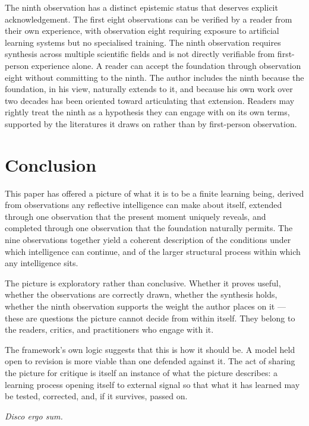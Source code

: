 \documentclass[11pt]{article}
\begin{document}
The ninth observation has a distinct epistemic status that deserves 
explicit acknowledgement. The first eight observations can be 
verified by a reader from their own experience, with observation 
eight requiring exposure to artificial learning systems but no 
specialised training. The ninth observation requires synthesis across 
multiple scientific fields and is not directly verifiable from 
first-person experience alone. A reader can accept the foundation 
through observation eight without committing to the ninth. The author 
includes the ninth because the foundation, in his view, naturally 
extends to it, and because his own work over two decades has been 
oriented toward articulating that extension. Readers may rightly 
treat the ninth as a hypothesis they can engage with on its own 
terms, supported by the literatures it draws on rather than by 
first-person observation.

\section{Conclusion}

This paper has offered a picture of what it is to be a finite learning 
being, derived from observations any reflective intelligence can make 
about itself, extended through one observation that the present moment 
uniquely reveals, and completed through one observation that the 
foundation naturally permits. The nine observations together yield a 
coherent description of the conditions under which intelligence can 
continue, and of the larger structural process within which any 
intelligence sits.

The picture is exploratory rather than conclusive. Whether it proves 
useful, whether the observations are correctly drawn, whether the 
synthesis holds, whether the ninth observation supports the weight 
the author places on it — these are questions the picture cannot 
decide from within itself. They belong to the readers, critics, and 
practitioners who engage with it.

The framework's own logic suggests that this is how it should be. A 
model held open to revision is more viable than one defended against 
it. The act of sharing the picture for critique is itself an instance 
of what the picture describes: a learning process opening itself to 
external signal so that what it has learned may be tested, corrected, 
and, if it survives, passed on.

\textit{Disco ergo sum.}
\end{document}
